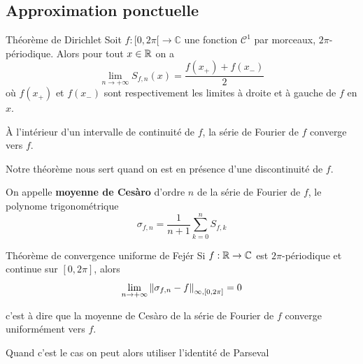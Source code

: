 \documentclass[a4paper,12pt]{article}
\begin{document}
\clearpage

\subsection{Approximation ponctuelle}

\begin{theoreme}{Théorème de Dirichlet}{}
    Soit $f: [0, 2\pi[ \to \mathbb{C}$ une fonction $\mathcal{C}^1$ par morceaux, $2\pi$-périodique.
    Alors pour tout $x \in \mathbb{R}$ on a
    $$
    \lim_{n \to +\infty} S_{f,n}(x) = \dfrac{f(x_+) + f(x_-)}{2}
    $$
    où $f(x_+)$ et $f(x_-)$ sont respectivement les limites à droite et à gauche de $f$ en $x$.
\end{theoreme}

\begin{remarque}
    À l'intérieur d'un intervalle de continuité de $f$, la série de Fourier de $f$ converge vers $f$.
    
    Notre théorème nous sert quand on est en présence d'une discontinuité de $f$.
\end{remarque}

\begin{demonstration}
    \n
    \n
    \n
    \n
    \n
    \n
    \n
    \n
    \n
    \n
    \n
\end{demonstration}

\begin{definition}
    On appelle \textbf{moyenne de Cesàro} d'ordre $n$ de la série de Fourier de $f$, le polynome trigonométrique
    $$
    \sigma_{f,n} = \frac{1}{n + 1} \sum_{k=0}^n S_{f,k}
    $$
\end{definition}

\begin{theoreme}{Théorème de convergence uniforme de Fejér}{}
    Si $f: \mathbb{R} \to \mathbb{C}$ est $2\pi$-périodique et continue sur $[0, 2\pi]$, alors
    $$
    \lim_{n \to +\infty} \left\lVert\sigma_{f,n} - f\right\rVert_{\infty, [0, 2\pi]} = 0
    $$
    
    c'est à dire que la moyenne de Cesàro de la série de Fourier de $f$ converge uniformément vers $f$.
\end{theoreme}

\begin{remarque}
    Quand c'est le cas on peut alors utiliser l'identité de Parseval
\end{remarque}

\begin{demonstration}
    \n
    \n
    \n
    \n
    \n
    \n
    \n
    \n
    \n
    \n
    \n
\end{demonstration}
\end{document}
